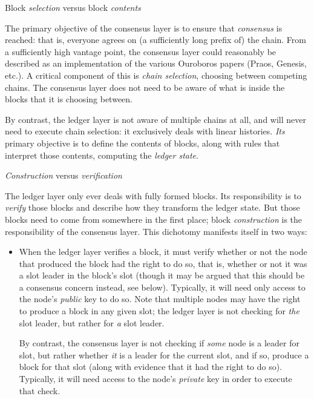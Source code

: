 \begin{description}
\item{Block \emph{selection} versus block \emph{contents}}

The primary objective of the consensus layer is to ensure that \emph{consensus}
is reached: that is, everyone agrees on (a sufficiently long prefix of) the
chain. From a sufficiently high vantage point, the consensus layer could
reasonably be described as an implementation of the various Ouroboros papers
(Praos, Genesis, etc.). A critical component of this is \emph{chain selection},
choosing between competing chains. The consensus layer does not need to be aware
of what is inside the blocks that it is choosing between.

By contrast, the ledger layer is not aware of multiple chains at all, and will
never need to execute chain selection: it exclusively deals with linear
histories. \emph{Its} primary objective is to define the contents of blocks,
along with rules that interpret those contents, computing the \emph{ledger
state}.

\item{\emph{Construction} versus \emph{verification}}

The ledger layer only ever deals with fully formed blocks. Its responsibility is
to \emph{verify} those blocks and describe how they transform the ledger state.
But those blocks need to come from somewhere in the first place; block
\emph{construction} is the responsibility of the consensus layer. This dichotomy
manifests itself in two ways:

\begin{itemize}
\item When the ledger layer verifies a block, it must verify whether or not the
node that produced the block had the right to do so, that is, whether or not it
was a slot leader in the block's slot (though it may be argued that this should
be a consensus concern instead, see below). Typically, it will need only access
to the node's \emph{public} key to do so. Note that multiple nodes may have the
right to produce a block in any given slot; the ledger layer is not checking
for \emph{the} slot leader, but rather for \emph{a} slot leader.

By contrast, the consensus layer is not checking if \emph{some} node is a leader
for slot, but rather whether \emph{it} is a leader for the current slot, and if
so, produce a block for that slot (along with evidence that it had the right to
do so). Typically, it will need access to the node's \emph{private} key in order
to execute that check.


\end{itemize}
\end{description}
